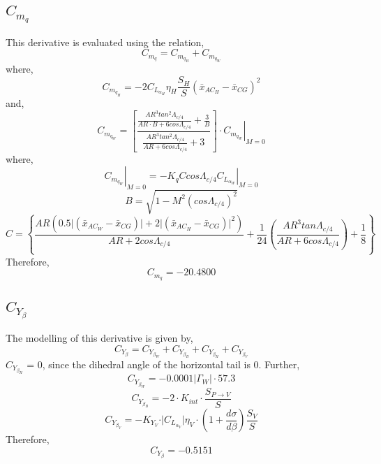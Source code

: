 \documentclass[letterpaper,12pt]{article}
\begin{document}
\subsection{$C_{m_q}$}
This derivative is evaluated using the relation,
\begin{equation*}
C_{m_q} = C_{m_{q_H}} + C_{m_{q_W}}
\end{equation*}
where,
\begin{equation*}
C_{m_{q_H}} = -2 C_{L_{\alpha_H}} \eta_H \frac{S_H}{S} (\bar{x}_{AC_H} - \bar{x}_{CG})^2
\end{equation*}
and,
\begin{equation*}
C_{m_{q_W}} = \left[\frac{\frac{AR^3tan^2\Lambda_{c/4}}{AR\cdot B + 6cos\Lambda_{c/4}} + \frac{3}{B}}{\frac{AR^3tan^2\Lambda_{c/4}}{AR + 6cos\Lambda_{c/4}} + 3}\right]\cdot \left. C_{m_{q_W}}\right\vert_{M = 0}
\end{equation*}
where,
\begin{equation*}
\left. C_{m_{q_W}}\right\vert_{M = 0} = -K_q C cos\Lambda_{c/4} \left. C_{L_{\alpha_W}}\right\vert_{M = 0}
\end{equation*}
\begin{equation*}
B = \sqrt{1-M^2 (cos \Lambda_{c/4})^2}
\end{equation*}
\begin{equation*}
C = \left\lbrace \frac{AR (0.5 \vert(\bar{x}_{AC_W} - \bar{x}_{CG})\vert + 2 \vert(\bar{x}_{AC_H} - \bar{x}_{CG})\vert^2)}{AR+2 cos\Lambda_{c/4}} + \frac{1}{24}\left(\frac{AR^3 tan\Lambda_{c/4}}{AR + 6 cos\Lambda_{c/4}}\right) + \frac{1}{8}\right\rbrace
\end{equation*}
Therefore,
\begin{equation*}
C_{m_q} = -20.4800
\end{equation*}
\subsection{$C_{Y_{\beta}}$}
The modelling of this derivative is given by,
\begin{equation*}
C_{Y_{\beta}} = C_{Y_{\beta_W}} + C_{Y_{\beta_B}} + C_{Y_{\beta_H}} + C_{Y_{\beta_V}} 
\end{equation*}
$C_{Y_{\beta_H}}$ = 0, since the dihedral angle of the horizontal tail is 0. Further,
\begin{equation*}
C_{Y_{\beta_W}} = -0.0001 \vert \Gamma_W\vert\cdot 57.3
\end{equation*}
\begin{equation*}
C_{Y_{\beta_B}} = -2\cdot K_{int}\cdot\frac{S_{P\rightarrow V}}{S}
\end{equation*}
\begin{equation*}
C_{Y_{\beta_V}} = -K_{Y_V}\cdot\vert C_{L_{\alpha_V}}\vert \eta_V\cdot\left(1+\frac{d\sigma}{d\beta}\right)\frac{S_V}{S}
\end{equation*}
Therefore,
\begin{equation*}
C_{Y_{\beta}} = -0.5151
\end{equation*}
\end{document}
